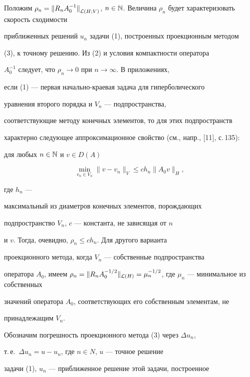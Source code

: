 Положим  $\rho_{n} ={\|R_nA^{-1}_{0} \|}_{{\cal L}(H;V)}$, $n \in


{\Bbb N}$. Величина $\rho_{n}$ будет характеризовать скорость сходимости


приближенных решений $u_n$ задачи (1), построенных проекционным методом


(3), к точному решению. Из (2) и условия компактности оператора


$A^{-1}_{0}$ следует, что $\rho_{n}\to 0$ при $n\to\infty$. В приложениях,


если (1) --- первая начально-краевая задача для гиперболического


уравнения второго порядка и $V_n$ --- подпространства,


соответствующие методу конечных элементов, то для этих подпространств


характерно следующее аппроксимационное свойство (см., напр., [11], с.\,135):


для любых $n\in {\Bbb N}$ и $v\in D(A)$


$$


\min_{v_{n}\in V_{n}}\|


v-v_{n}\|_{V} \leq ch_{n}\|A_{0}v \|_{H},


$$


где $h_n$ ---


максимальный из диаметров конечных элементов, порождающих


подпространство $V_n$, $c$ --- константа, не зависящая от $n$


и $v$.  Тогда, очевидно, $\rho_{n}\leq ch_n$.  Для другого варианта


проекционного метода, когда $V_n$ --- собственные подпространства


оператора $A_0$, имеем $\rho_{n} = \|R_{n} A^{-1/2}_{0}\|_{{\cal


L}(H)} =\mu^{-1/2}_n$, где $\mu_n$ --- минимальное из собственных


значений оператора $A_0$, соответствующих его собственным элементам, не


принадлежащим $V_n$.





Обозначим погрешность проекционного метода (3) через $\Delta u_{n}$,


т.\,е.~$\Delta u_{n} = u-u_{n}$, где $n\in N$, $u$ --- точное решение


задачи (1), $u_n$ --- приближенное решение этой задачи, построенное



